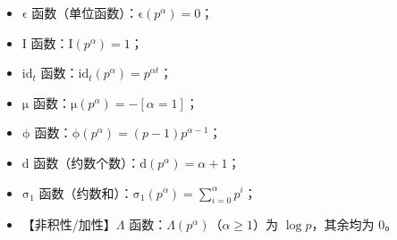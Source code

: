 \begin{itemize}
\item $\mathrm{\epsilon}$ 函数（单位函数）：$\mathrm{\epsilon} (p ^ \alpha) = 0$；
\item $\mathrm{I}$ 函数：$\mathrm{I} (p ^ \alpha) = 1$；
\item $\mathrm{id}_t$ 函数：$\mathrm{id}_t (p ^ \alpha) = p ^ {\alpha t}$；
\item $\mathrm{\mu}$ 函数：$\mathrm{\mu} (p ^ \alpha) = - \left [ \alpha = 1 \right ]$；
\item $\mathrm{\phi}$ 函数：$\mathrm{\phi} (p ^ \alpha) = (p - 1) p ^ {\alpha - 1}$；
\item $\mathrm{d}$ 函数（约数个数）：$\mathrm{d} (p ^ \alpha) = \alpha + 1$；
\item $\mathrm{\sigma}_1$ 函数（约数和）：$\mathrm{\sigma}_1 (p ^ \alpha) = \sum_{i = 0}^{\alpha} p ^ i$；
\item 【非积性/加性】$\Lambda$ 函数：$\Lambda (p ^ \alpha)$（$\alpha \geq 1$）为 $\log p$，其余均为 $0$。
\end{itemize}
